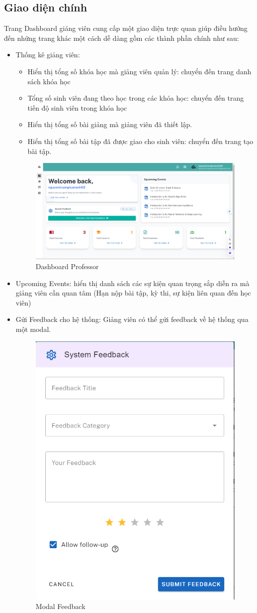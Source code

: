 \subsection{Giao diện chính}
Trang Dashboard giáng viên cung cấp một giao diện trực quan giúp điều hướng đến những trang khác một cách dễ dàng gồm các thành phần chính như sau:
\begin{itemize}
    \item Thống kê giảng viên:
    \begin{itemize}
        \item Hiển thị tổng số khóa học mà giảng viên quản lý: chuyển đến trang danh sách khóa học
        \item Tổng số sinh viên đang theo học trong các khóa học: chuyển đến trang tiến độ sinh viên trong khóa học
        \item Hiển thị tổng số bài giảng mà giảng viên đã thiết lập.
        \item Hiển thị tổng số bài tập đã được giao cho sinh viên: chuyển đến trang tạo bài tập.
    \end{itemize}
    \begin{figure}[H]
        \centering
        \includegraphics[width=0.8\linewidth]{images/dashboard_professor.png}
        \caption{Dashboard Professor}
        \label{fig:dashboard_professor}
    \end{figure}
    \item Upcoming Events: hiển thị danh sách các sự kiện quan trọng sắp diễn ra mà giảng viên cần quan tâm (Hạn nộp bài tập, kỳ thi, sự kiện liên quan đến học viên)
    \item Gửi Feedback cho hệ thống: Giảng viên có thể gửi feedback về hệ thống qua một modal.
    \begin{figure}[H]
        \centering
        \includegraphics[width=0.3\linewidth]{images/modal_feedback.png}
        \caption{Modal Feedback}
        \label{fig:modal_feedback}
    \end{figure}
\end{itemize}
